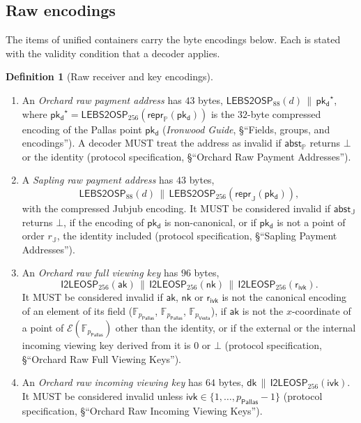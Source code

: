\documentclass[11pt,a4paper]{article}
\theoremstyle{definition}
\newtheorem{definition}[theorem]{Definition}
\newcommand{\F}{\mathbb{F}}
\newcommand{\PP}{\mathbb{P}}
\newcommand{\Pallas}{\ensuremath{\mathsf{Pallas}}}
\newcommand{\Vesta}{\ensuremath{\mathsf{Vesta}}}
\newcommand{\Ep}{\ensuremath{\mathcal{E}}}
\newcommand{\aksym}{\ensuremath{\mathsf{ak}}}
\newcommand{\nksym}{\ensuremath{\mathsf{nk}}}
\newcommand{\ivk}{\ensuremath{\mathsf{ivk}}}
\newcommand{\dk}{\ensuremath{\mathsf{dk}}}
\newcommand{\pkd}{\ensuremath{\mathsf{pk_d}}}
\newcommand{\rivk}{\ensuremath{\mathsf{r_{ivk}}}}
\begin{document}
\subsection{Raw encodings}\label{sec:addr-raw}

The items of unified containers carry the byte encodings below. Each is
stated with the validity condition that a decoder applies.

\begin{definition}[Raw receiver and key encodings]\label{def:addr-raw}
\begin{enumerate}[label=(\alph*)]
\item An \emph{Orchard raw payment address} has $43$ bytes,
  $\mathsf{LEBS2OSP}_{88}(d) \,\|\, \pkd^{\star}$, where
  $\pkd^{\star} = \mathsf{LEBS2OSP}_{256}(\mathsf{repr}_{\PP}(\pkd))$ is the
  $32$-byte compressed encoding of the Pallas point $\pkd$ (\emph{Ironwood
  Guide}, \S``Fields, groups, and encodings''). A decoder MUST treat the
  address as invalid if $\mathsf{abst}_{\PP}$ returns $\bot$ or the
  identity (protocol specification, \S``Orchard Raw Payment Addresses'').
\item A \emph{Sapling raw payment address} has $43$ bytes,
  \[
    \mathsf{LEBS2OSP}_{88}(d) \,\|\,
    \mathsf{LEBS2OSP}_{256}(\mathsf{repr}_{\mathbb{J}}(\pkd)),
  \]
  with the compressed Jubjub encoding. It MUST be considered invalid if
  $\mathsf{abst}_{\mathbb{J}}$ returns $\bot$, if the encoding of $\pkd$ is
  non-canonical, or if $\pkd$ is not a point of order $r_{\mathbb{J}}$, the
  identity included (protocol specification, \S``Sapling Payment
  Addresses'').
\item An \emph{Orchard raw full viewing key} has $96$ bytes,
  \[
    \mathsf{I2LEOSP}_{256}(\aksym) \,\|\, \mathsf{I2LEOSP}_{256}(\nksym)
    \,\|\, \mathsf{I2LEOSP}_{256}(\rivk).
  \]
  It MUST be considered invalid if
  $\aksym$, $\nksym$ or $\rivk$ is not the canonical encoding of an element
  of its field ($\F_{p_{\Pallas}}$, $\F_{p_{\Pallas}}$, $\F_{p_{\Vesta}}$),
  if $\aksym$ is not the $x$-coordinate of a point of
  $\Ep(\F_{p_{\Pallas}})$ other than the identity, or if the external or
  the internal incoming viewing key derived from it is $0$ or $\bot$
  (protocol specification, \S``Orchard Raw Full Viewing Keys'').
\item An \emph{Orchard raw incoming viewing key} has $64$ bytes,
  $\dk \,\|\, \mathsf{I2LEOSP}_{256}(\ivk)$. It MUST be considered invalid
  unless $\ivk \in \{1, \dots, p_{\Pallas} - 1\}$ (protocol specification,
  \S``Orchard Raw Incoming Viewing Keys'').

\end{enumerate}
\end{definition}
\end{document}
